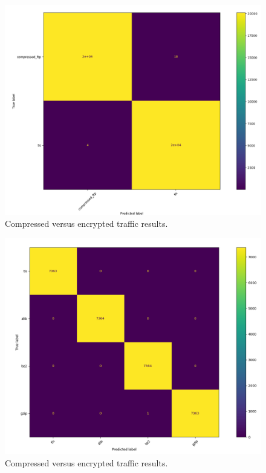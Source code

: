 \begin{figure} [ht!]
\centering
\includegraphics[scale=0.4]{chapters/7/img/compressed_tls.png}
\caption{Compressed versus encrypted traffic results.}
\label{fig:tlscomp}
\end{figure}

\begin{figure} [ht!]
\centering
\includegraphics[scale=0.4]{chapters/7/img/encrypted_compressed.png}
\caption{Compressed versus encrypted traffic results.}
\label{fig:comptype}
\end{figure}



